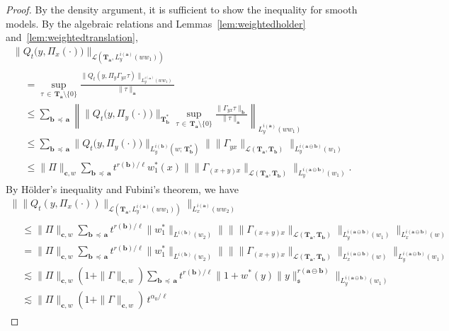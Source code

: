 \documentclass[10pt]{amsart}
\theoremstyle{definition}
\numberwithin{equation}{section}
\newcommand{\mfs}{\mathfrak{s}}
\newcommand{\wco}{w^*}
\newcommand{\bfa}{\mathbf{a}}
\newcommand{\bfb}{\mathbf{b}}
\newcommand{\bfc}{\mathbf{c}}
\newcommand{\bfaob}{\mathbf{a}\ominus\mathbf{b}}
\newcommand{\bfT}{\mathbf{T}}
\newcommand{\mcL}{\mathcal{L}}
\begin{document}
\begin{proof}
By the density argument, it is sufficient to show the inequality for smooth models. By the algebraic relations and Lemmas~\ref{lem:weightedholder} and~\ref{lem:weightedtranslation},
\begingroup
\allowdisplaybreaks
\begin{multline*}
\big\|Q_t\big(y,\Pi_x(\cdot)\big)\big\|_{\mcL\left(\bfT_\bfa,L_y^{i(\bfa)}(ww_1)\right)}\\
\begin{aligned}
&=\sup_{\tau\,\in\,\bfT_\bfa\setminus\{0\}}\frac{\|Q_t(y,\Pi_y\Gamma_{yx}\tau)\|_{L_y^{i(\bfa)}(ww_1)}}{\|\tau\|_\bfa}\\
&\le\sum_{\bfb\,\preceq\,\bfa}\left\|\big\|Q_t\big(y,\Pi_y(\cdot)\big)\big\|_{\bfT_{\bfb}^*}
\sup_{\tau\,\in\,\bfT_\bfa\setminus\{0\}}\frac{\|\Gamma_{yx}\tau\|_{\bfb}}{\|\tau\|_\bfa}\right\|_{L_y^{i(\bfa)}(ww_1)}\\
&\le \sum_{\bfb\,\preceq\,\bfa}\big\|Q_t\big(y,\Pi_y(\cdot)\big)\big\|_{L_y^{i(\bfb)}\left(w;\,\bfT_\bfb^*\right)}
\big\|\|\Gamma_{yx}\|_{\mcL\left(\bfT_\bfa,\bfT_\bfb\right)}\big\|_{L_y^{i(\bfa\ominus\bfb)}(w_1)}\\
&\le \|\Pi\|_{\bfc,w}\sum_{\bfb\,\preceq\,\bfa}t^{r(\bfb)/\ell}\wco_1(x)
\big\|\|\Gamma_{(x+y)x}\|_{\mcL(\bfT_\bfa,\bfT_\bfb)}\big\|_{L_y^{i(\bfa\ominus\bfb)}(w_1)}.
\end{aligned}
\end{multline*}
\endgroup
By H\"older's inequality and Fubini's theorem, we have
\begingroup
\allowdisplaybreaks
\begin{multline*}
\Big\|\big\|Q_t\left(y,\Pi_x(\cdot)\right)\big\|_{\mcL(\bfT_\bfa,L_y^{i(\bfa)}(ww_1))}\Big\|_{L_x^{i(\bfa)}(ww_2)}\\
\begin{aligned}
&\le \|\Pi\|_{\bfc,w}\sum_{\bfb\,\preceq\,\bfa}t^{r(\bfb)/\ell}\|\wco_1\|_{L^{i(\bfb)}(w_2)}
\Big\|\big\|\|\Gamma_{(x+y)x}\|_{\mcL(\bfT_\bfa,\bfT_\bfb)}\big\|_{L_y^{i(\bfaob)}(w_1)}\Big\|_{L_x^{i(\bfaob)}(w)}\\
&=\|\Pi\|_{\bfc,w}\sum_{\bfb\,\preceq\,\bfa}t^{r(\bfb)/\ell}\|\wco_1\|_{L^{i(\bfb)}(w_2)}
\Big\|\big\|\|\Gamma_{(x+y)x}\|_{\mcL(\bfT_\bfa,\bfT_\bfb)}\big\|_{L_x^{i(\bfaob)}(w)}\Big\|_{L_y^{i(\bfaob)}(w_1)}\\
&\lesssim\|\Pi\|_{\bfc,w}(1+\|\Gamma\|_{\bfc,w})\sum_{\bfb\,\preceq\,\bfa}t^{r(\bfb)/\ell}\big\|1+\wco(y)\|y\|_\mfs^{r(\bfaob)}\big\|_{L_y^{i(\bfaob)}(w_1)}\\
&\lesssim\|\Pi\|_{\bfc,w}(1+\|\Gamma\|_{\bfc,w})\, t^{\alpha_0/\ell}
\end{aligned}

\end{multline*}
\end{proof}
\end{document}
